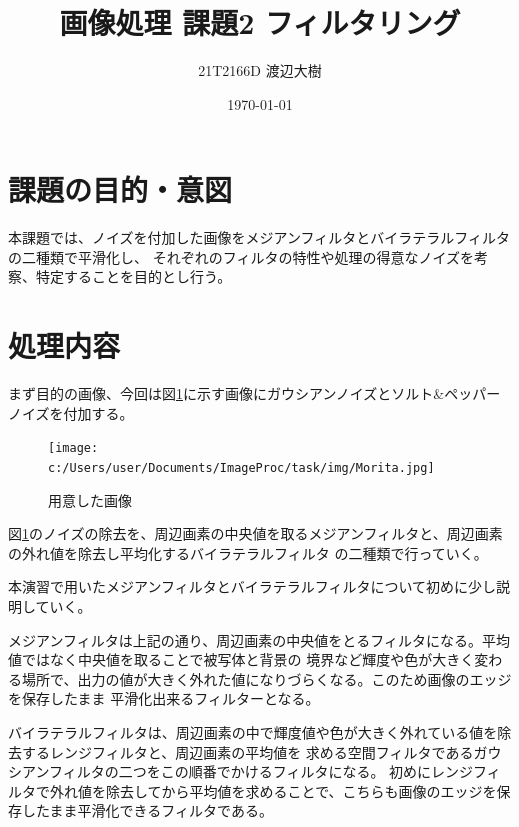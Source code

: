 \documentclass[a4paper,11pt,dvipdfmx]{jsarticle}
\begin{document}

\title{画像処理 課題2 フィルタリング}
\author{21T2166D 渡辺大樹}
\date{\today}
\maketitle

\section{課題の目的・意図}
本課題では、ノイズを付加した画像をメジアンフィルタとバイラテラルフィルタの二種類で平滑化し、
それぞれのフィルタの特性や処理の得意なノイズを考察、特定することを目的とし行う。

\section{処理内容}
まず目的の画像、今回は図\ref{Morita}に示す画像にガウシアンノイズとソルト\&ペッパーノイズを付加する。
\begin{figure}[h]
\centering
\texttt{[image: c:/Users/user/Documents/ImageProc/task/img/Morita.jpg]}
\caption{用意した画像}
\label{Morita}
\end{figure}
図\ref{Morita}のノイズの除去を、周辺画素の中央値を取るメジアンフィルタと、周辺画素の外れ値を除去し平均化するバイラテラルフィルタ
の二種類で行っていく。

本演習で用いたメジアンフィルタとバイラテラルフィルタについて初めに少し説明していく。

メジアンフィルタは上記の通り、周辺画素の中央値をとるフィルタになる。平均値ではなく中央値を取ることで被写体と背景の
境界など輝度や色が大きく変わる場所で、出力の値が大きく外れた値になりづらくなる。このため画像のエッジを保存したまま
平滑化出来るフィルターとなる。

バイラテラルフィルタは、周辺画素の中で輝度値や色が大きく外れている値を除去するレンジフィルタと、周辺画素の平均値を
求める空間フィルタであるガウシアンフィルタの二つをこの順番でかけるフィルタになる。
初めにレンジフィルタで外れ値を除去してから平均値を求めることで、こちらも画像のエッジを保存したまま平滑化できるフィルタである。
\end{document}
